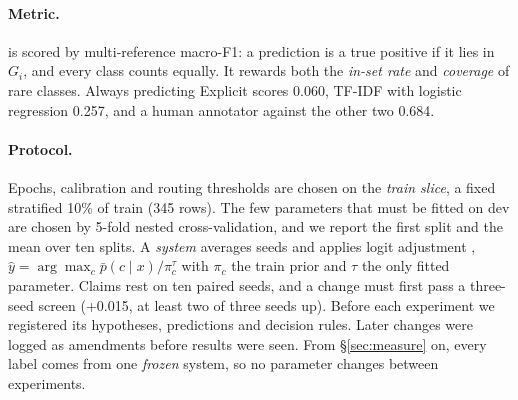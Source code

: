 \paragraph{Metric.}
\Stwo{} is scored by multi-reference macro-F1: a prediction is a true positive if it lies in $G_i$, and every class counts equally.
It rewards both the \emph{in-set rate} and \emph{coverage} of rare classes.
Always predicting Explicit scores 0.060, TF-IDF with logistic regression 0.257, and a human annotator against the other two 0.684.

\paragraph{Protocol.}
Epochs, calibration and routing thresholds are chosen on the \emph{train slice}, a fixed stratified 10\% of train (345 rows).
The few parameters that must be fitted on dev are chosen by 5-fold nested cross-validation, and we report the first split and the mean over ten splits.
A \emph{system} averages seeds and applies logit adjustment \citep{menon2021longtail}, $\hat y = \arg\max_c \bar p(c \mid x)/\pi_c^{\tau}$ with $\pi_c$ the train prior and $\tau$ the only fitted parameter.
Claims rest on ten paired seeds, and a change must first pass a three-seed screen (+0.015, at least two of three seeds up).
Before each experiment we registered its hypotheses, predictions and decision rules. Later changes were logged as amendments before results were seen.
From \S\ref{sec:measure} on, every label comes from one \emph{frozen} system, so no parameter changes between experiments.
